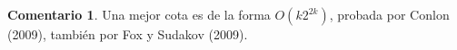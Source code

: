 \documentclass[12pt]{report}
\theoremstyle{plain}
\theoremstyle{definition}
\newtheorem{remark}[theorem]{Comentario}
\begin{document}
\begin{remark}
Una mejor cota es de la forma $O(k 2^{2k})$, probada por Conlon (2009), también por Fox y Sudakov (2009).
\end{remark}
































%





\newpage


{}

\end{document}
